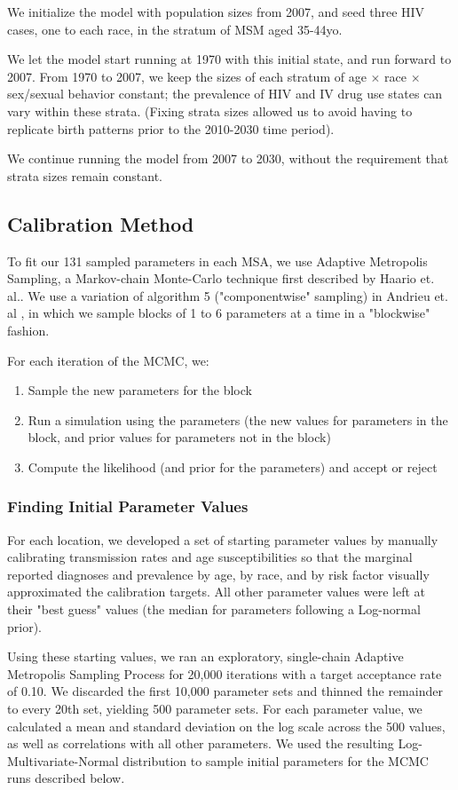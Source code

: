 \documentclass{article}
\begin{document}
We initialize the model with population sizes from 2007, and seed three HIV cases, one to each race, in the stratum of MSM aged 35-44yo.

We let the model start running at 1970 with this initial state, and run forward to 2007. From 1970 to 2007, we keep the sizes of each stratum of age $\times$ race $\times$ sex/sexual behavior constant; the prevalence of HIV and IV drug use states can vary within these strata. (Fixing strata sizes allowed us to avoid having to replicate birth patterns prior to the 2010-2030 time period).

We continue running the model from 2007 to 2030, without the requirement that strata sizes remain constant.


\subsection{Calibration Method}
To fit our 131 sampled parameters in each MSA, we use Adaptive Metropolis Sampling, a Markov-chain Monte-Carlo technique first described by Haario et. al.\cite{haario2001}. We use a variation of algorithm 5 ("componentwise" sampling) in Andrieu et. al \cite{andrieu2008}, in which we sample blocks of 1 to 6 parameters at a time in a "blockwise" fashion.

For each iteration of the MCMC, we: 
\begin{enumerate}
	\item Sample the new parameters for the block
	\item Run a simulation using the parameters (the new values for parameters in the block, and prior values for parameters not in the block)
	\item Compute the likelihood (and prior for the parameters) and accept or reject
\end{enumerate}

\subsubsection{Finding Initial Parameter Values} \label{init_params}
For each location, we developed a set of starting parameter values by manually calibrating transmission rates and age susceptibilities so that the marginal reported diagnoses and prevalence by age, by race, and by risk factor visually approximated the calibration targets. All other parameter values were left at their "best guess" values (the median for parameters following a Log-normal prior).

Using these starting values, we ran an exploratory, single-chain Adaptive Metropolis Sampling Process for 20,000 iterations with a target acceptance rate of 0.10. We discarded the first 10,000 parameter sets and thinned the remainder to every 20th set, yielding 500 parameter sets. For each parameter value, we calculated a mean and standard deviation on the log scale across the 500 values, as well as correlations with all other parameters. We used the resulting Log-Multivariate-Normal distribution to sample initial parameters for the MCMC runs described below.
\end{document}
